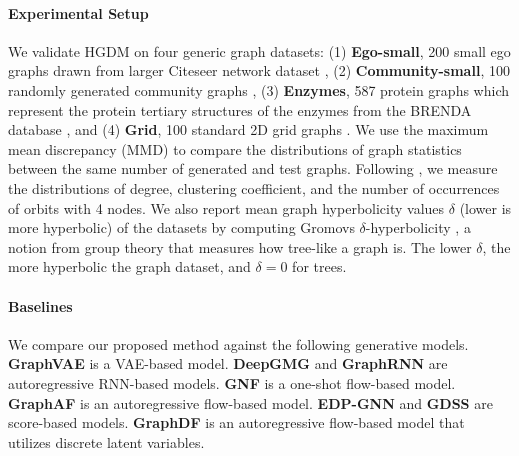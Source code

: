 \documentclass[letterpaper]{article} %
\begin{document}
\paragraph{Experimental Setup}
We validate HGDM on four generic graph datasets: (1) \textbf{Ego-small}, 200 small ego graphs drawn from larger Citeseer network dataset \cite{sen2008collective}, (2) \textbf{Community-small}, 100 randomly generated community graphs \cite{jo2022score}, (3) \textbf{Enzymes}, 587 protein graphs which represent the protein tertiary structures of the enzymes from the BRENDA database \cite{schomburg2004brenda}, and (4) \textbf{Grid}, 100 standard 2D grid graphs \cite{jo2022score}. We use the maximum mean discrepancy (MMD) to compare the distributions of graph statistics between the same number of generated and test graphs. Following \citet{jo2022score}, we measure the distributions of degree, clustering coefficient, and the number of occurrences of orbits with 4 nodes. We also report mean graph hyperbolicity values $\delta$ (lower is more hyperbolic) of the datasets by computing Gromovs $\delta$-hyperbolicity \cite{adcock2013tree}, a notion from group theory that measures how tree-like a graph is. The lower $\delta$, the more hyperbolic the graph dataset, and $\delta=0$ for trees.

\paragraph{Baselines}
We compare our proposed method against the following generative models. \textbf{GraphVAE} \cite{simonovsky2018graphvae} is a VAE-based model. \textbf{DeepGMG} \cite{li2018learning} and \textbf{GraphRNN} \cite{you2018graphrnn} are autoregressive RNN-based models. \textbf{GNF} \cite{liu2019graph} is a one-shot flow-based model. \textbf{GraphAF} \cite{shi2020graphaf} is an autoregressive flow-based model. \textbf{EDP-GNN} \cite{niu2020permutation} and \textbf{GDSS} \cite{jo2022score} are score-based models. \textbf{GraphDF} \cite{luo2021graphdf} is an autoregressive flow-based model that utilizes discrete latent variables. 
\end{document}
